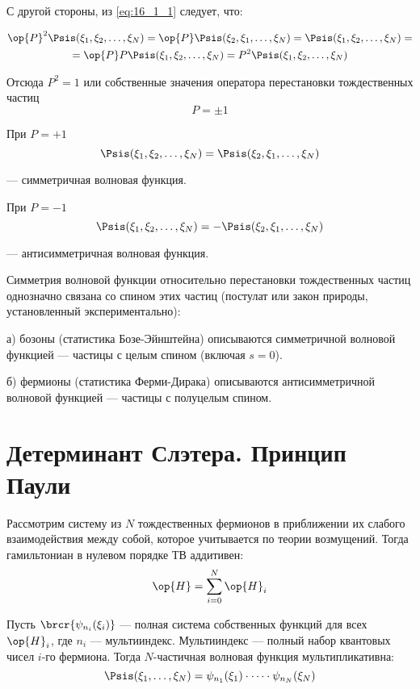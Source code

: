С другой стороны, из \eqref{eq:16_1_1} следует, что:

\begin{gather*}
\op{P}^2 \Psis(\xi_1, \xi_2, \dots, \xi_N) = \op{P}\Psis(\xi_2, \xi_1, \dots, \xi_N) = \Psis(\xi_1, \xi_2, \dots, \xi_N) = \\= \op{P} P\Psis(\xi_1, \xi_2, \dots, \xi_N) = P^2 \Psis(\xi_1, \xi_2, \dots, \xi_N)
\end{gather*}

Отсюда $P^2 = 1$ или собственные значения оператора перестановки тождественных частиц 
$$\boxed{P = \pm 1}$$

При $P = +1$
$$
\Psis(\xi_1, \xi_2, \dots, \xi_N) = \Psis(\xi_2, \xi_1, \dots, \xi_N)
$$

--- симметричная волновая функция.

При $P = -1$
$$
\Psis(\xi_1, \xi_2, \dots, \xi_N) = -\Psis(\xi_2, \xi_1, \dots, \xi_N)
$$ 

--- антисимметричная волновая функция.

Симметрия волновой функции относительно перестановки тождественных частиц однозначно связана со спином этих частиц (постулат или закон природы, установленный экспериментально):

а) бозоны (статистика Бозе-Эйнштейна) описываются симметричной волновой функцией --- частицы с целым спином (включая $s = 0$).

б) фермионы (статистика Ферми-Дирака) описываются антисимметричной волновой функцией --- частицы с полуцелым спином.

\section{Детерминант Слэтера. Принцип Паули}

Рассмотрим систему из $N$ тождественных фермионов в приближении их слабого взаимодействия между собой, которое учитывается по теории возмущений. Тогда гамильтониан в нулевом порядке ТВ аддитивен:
$$
\op{H} = \sum_{i=0}^N\op{H}_i
$$

Пусть $\brcr{\psi_{n_i}(\xi_i)}$ --- полная система собственных функций для всех $\op{H}_i$, где $n_i$ --- мультииндекс. Мультииндекс --- полный набор квантовых чисел $i$-го фермиона. Тогда $N$-частичная волновая функция мультипликативна:
\begin{equation}
\label{eq:16_2_1}
\Psis(\xi_1, \dots, \xi_N) = \psi_{n_1}(\xi_1) \cdot \dots \cdot \psi_{n_N}(\xi_N)
\end{equation}

